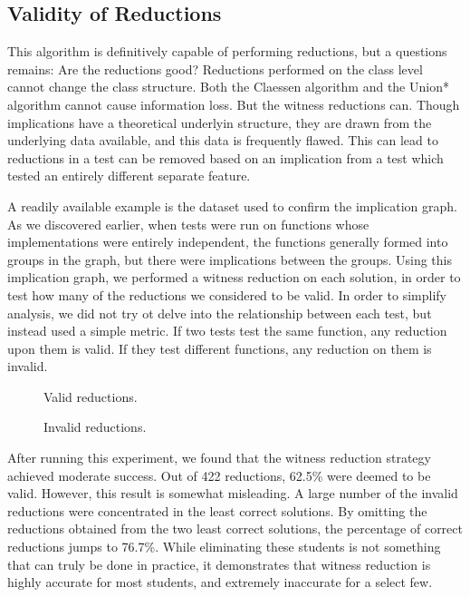 \documentclass[11pt,twoside]{article}
\begin{document}
\subsection{Validity of Reductions}

This algorithm is definitively  capable of performing reductions, but a questions remains: Are the reductions good? Reductions performed on the class level cannot change the class structure. Both the Claessen algorithm and the Union* algorithm cannot cause information loss. But the witness reductions can. Though implications have a theoretical underlyin structure, they are drawn from the underlying data available, and this data is frequently flawed. This can lead to reductions in a test can be removed based on an implication from a test which tested an entirely different separate feature.

A readily available example is the dataset used to confirm the implication graph. As we discovered earlier, when tests were run on functions whose implementations were entirely independent, the functions generally formed into groups in the  graph, but there were implications between the groups. Using this implication graph, we performed a witness reduction on each solution, in order to test how many of the reductions we considered to be valid. In order to simplify analysis, we did not try ot delve into the relationship between each test, but instead used a simple metric. If two tests test the same function, any reduction upon them is valid. If they test different  functions, any reduction on them is invalid.


\begin{figure}

\caption{Valid reductions.}

\caption{Invalid reductions.}
\end{figure}


After running this experiment, we found that the witness reduction strategy achieved moderate success. Out of 422 reductions, 62.5\% were deemed to be valid. However, this result is somewhat misleading. A large number of the invalid reductions were concentrated in the least correct solutions. By omitting the reductions obtained from the two least correct solutions, the percentage of correct reductions jumps to 76.7\%. While eliminating these students is not something that can truly be done in practice, it demonstrates that witness reduction is highly accurate for most students, and extremely inaccurate for a select few.
\end{document}
